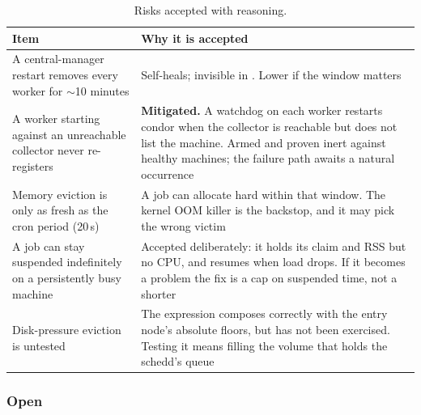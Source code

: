 \begin{table}[H]
\centering
\begin{tabularx}{\textwidth}{L{0.36\textwidth} Y}
\toprule
\textbf{Item} & \textbf{Why it is accepted} \\
\midrule
A central-manager restart removes every worker for $\sim$10 minutes & Self-heals; invisible in . Lower  if the window matters \\
A worker starting against an unreachable collector never re-registers & \textbf{Mitigated.} A watchdog on each worker restarts condor when the collector is reachable but does not list the machine. Armed and proven inert against healthy machines; the failure path awaits a natural occurrence \\
Memory eviction is only as fresh as the cron period (20\,s) & A job can allocate hard within that window. The kernel OOM killer is the backstop, and it may pick the wrong victim \\
A job can stay suspended indefinitely on a persistently busy machine & Accepted deliberately: it holds its claim and RSS but no CPU, and resumes when load drops. If it becomes a problem the fix is a cap on suspended time, not a shorter  \\
Disk-pressure eviction is untested & The expression composes correctly with the entry node's absolute floors, but has not been exercised. Testing it means filling the volume that holds the schedd's queue \\
\bottomrule
\end{tabularx}
\caption{Risks accepted with reasoning.}
\end{table}

\subsubsection{Open}

